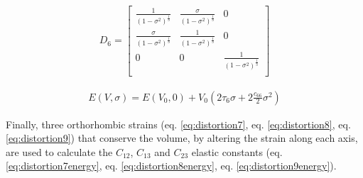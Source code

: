 \begin{center}
\begin{minipage}{.39\textwidth}
  \begin{equation}
    \begin{split}
      D_{6} = 
      \begin{bmatrix}
      \frac{1}{(1-\sigma^2)^{\frac{1}{3}}}        & \frac{\sigma}{(1-\sigma^2)^{\frac{1}{3}}} & 0   \\
      \frac{\sigma}{(1-\sigma^2)^{\frac{1}{3}}}   & \frac{1}{(1-\sigma^2)^{\frac{1}{3}}}      &   0  \\
      0                                           & 0                                         & \frac{1}{(1-\sigma^2)^{\frac{1}{3}}}       \\
      \end{bmatrix}
    \end{split}
  \label{eq:distortion6}
  \end{equation}
\end{minipage}
\begin{minipage}{.04\textwidth}
\end{minipage}
\begin{minipage}{.56\textwidth}
  \begin{equation}
    \begin{split}
    E(V,\sigma) = E(V_{0},0) + V_{0} \left(2 \tau_{6} \sigma + 2 \frac{c_{66}}{2} \sigma^2 \right)
    \end{split}
  \label{eq:distortion6energy}
  \end{equation}
\end{minipage}
\end{center}


Finally, three orthorhombic strains (eq. \ref{eq:distortion7}, eq. \ref{eq:distortion8}, eq. \ref{eq:distortion9}) that conserve the volume, by altering the strain along each axis, are used to calculate the $C_{12}$, $C_{13}$ and $C_{23}$ elastic constants (eq. \ref{eq:distortion7energy}, eq. \ref{eq:distortion8energy}, eq. \ref{eq:distortion9energy}).




